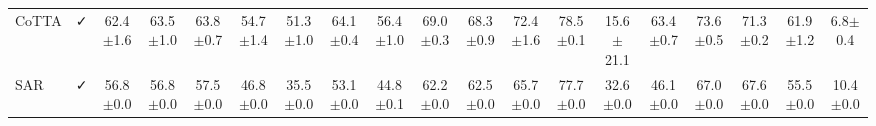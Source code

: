 \begin{table}[htbp]
{\begin{tabular}{l|c|ccccccccccccccc|c|c}
CoTTA & ✓ & 62.4$\pm$1.6 & 63.5$\pm$1.0 & 63.8$\pm$0.7 & 54.7$\pm$1.4 & 51.3$\pm$1.0 & 64.1$\pm$0.4 & 56.4$\pm$1.0 & 69.0$\pm$0.3 & 68.3$\pm$0.9 & 72.4$\pm$1.6 & 78.5$\pm$0.1 & 15.6$\pm$21.1 & 63.4$\pm$0.7 & 73.6$\pm$0.5 & 71.3$\pm$0.2 & 61.9$\pm$1.2 & 6.8$\pm$0.4 \\
SAR & ✓ & 56.8$\pm$0.0 & 56.8$\pm$0.0 & 57.5$\pm$0.0 & 46.8$\pm$0.0 & 35.5$\pm$0.0 & 53.1$\pm$0.0 & 44.8$\pm$0.1 & 62.2$\pm$0.0 & 62.5$\pm$0.0 & 65.7$\pm$0.0 & 77.7$\pm$0.0 & 32.6$\pm$0.0 & 46.1$\pm$0.0 & 67.0$\pm$0.0 & 67.6$\pm$0.0 & 55.5$\pm$0.0 & 10.4$\pm$0.0 \\
\hline
\end{tabular}
}
\end{table}